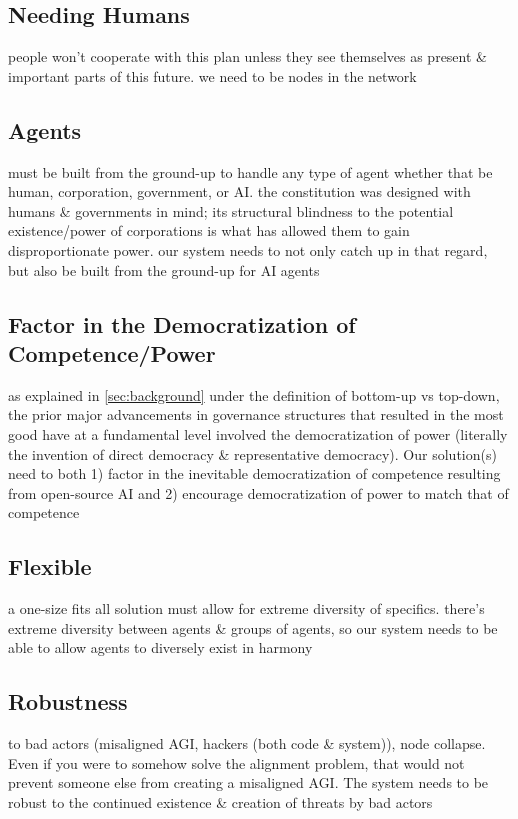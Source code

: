 \documentclass{article}
\begin{document}
\subsection{Needing Humans}
people won't cooperate with this plan unless they see themselves as present \& important parts of this future. we need to be nodes in the network

\subsection{Agents}
must be built from the ground-up to handle any type of agent whether that be human, corporation, government, or AI. the constitution was designed with humans \& governments in mind; its structural blindness to the potential existence/power of corporations is what has allowed them to gain disproportionate power. our system needs to not only catch up in that regard, but also be built from the ground-up for AI agents

\subsection{Factor in the Democratization of Competence/Power}
as explained in \ref{sec:background} under the definition of bottom-up vs top-down, the prior major advancements in governance structures that resulted in the most good have at a fundamental level involved the democratization of power (literally the invention of direct democracy \& representative democracy). Our solution(s) need to both 1) factor in the inevitable democratization of competence resulting from open-source AI and 2) encourage democratization of power to match that of competence

\subsection{Flexible}
a one-size fits all solution must allow for extreme diversity of specifics. there's extreme diversity between agents \& groups of agents, so our system needs to be able to allow agents to diversely exist in harmony

\subsection{Robustness}
to bad actors (misaligned AGI, hackers (both code \& system)), node collapse. Even if you were to somehow solve the alignment problem, that would not prevent someone else from creating a misaligned AGI. The system needs to be robust to the continued existence \& creation of threats by bad actors
\end{document}
